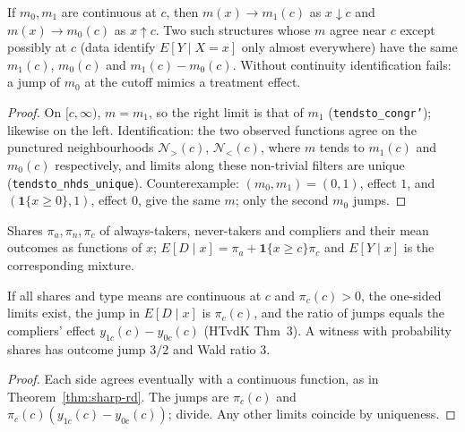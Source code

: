 \begin{theorem}
\label{thm:sharp-rd}
\leanok
{}
If $m_0, m_1$ are continuous at $c$, then $m(x)\to m_1(c)$ as $x\downarrow c$ and $m(x)\to m_0(c)$ as $x\uparrow c$.
Two such structures whose $m$ agree near $c$ except possibly at $c$ (data identify $E[Y\mid X=x]$ only almost everywhere) have the same $m_1(c)$, $m_0(c)$ and $m_1(c) - m_0(c)$. Without continuity identification fails: a jump of $m_0$ at the cutoff mimics a treatment effect.
\end{theorem}
\begin{proof}
\leanok
On $[c,\infty)$, $m = m_1$, so the right limit is that of $m_1$ (\texttt{tendsto\_congr'}); likewise on the left.
Identification: the two observed functions agree on the punctured neighbourhoods $\mathcal N_{>}(c)$, $\mathcal N_{<}(c)$,
where $m$ tends to $m_1(c)$ and $m_0(c)$ respectively, and limits along these non-trivial filters are unique
(\texttt{tendsto\_nhds\_unique}). Counterexample: $(m_0,m_1) = (0, 1)$, effect $1$, and $(\mathbf 1\{x\ge 0\}, 1)$, effect $0$, give the same $m$; only the second $m_0$ jumps.
\end{proof}

\begin{definition}[Fuzzy RD]
\label{def:fuzzy-rd}
\leanok
Shares $\pi_a, \pi_n, \pi_c$ of always-takers, never-takers and compliers and their mean outcomes as functions of $x$;
$E[D\mid x] = \pi_a + \mathbf 1\{x\ge c\}\pi_c$ and $E[Y\mid x]$ is the corresponding mixture.
\end{definition}

\begin{theorem}
\label{thm:fuzzy-rd}
\leanok
{}
If all shares and type means are continuous at $c$ and $\pi_c(c) > 0$, the one-sided limits exist, the jump in
$E[D\mid x]$ is $\pi_c(c)$, and the ratio of jumps equals the compliers' effect $y_{1c}(c) - y_{0c}(c)$
(HTvdK Thm~3). A witness with probability shares has outcome jump $3/2$ and Wald ratio $3$.
\end{theorem}
\begin{proof}
\leanok
Each side agrees eventually with a continuous function, as in Theorem~\ref{thm:sharp-rd}. The jumps are
$\pi_c(c)$ and $\pi_c(c)(y_{1c}(c) - y_{0c}(c))$; divide. Any other limits coincide by uniqueness.
\end{proof}

